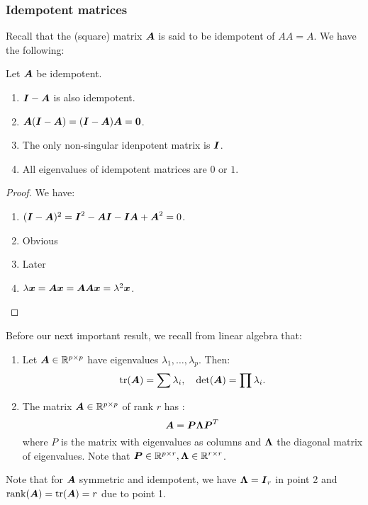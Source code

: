 \subsubsection{Idempotent matrices}
Recall that the (square) matrix $\boldsymbol{A}$ is said to be idempotent of $AA=A$. We have the following:
\begin{proposition}
    Let $\boldsymbol{A}$ be idempotent.
    \begin{enumerate}
        \item $\boldsymbol{I}-\boldsymbol{A}$ is also idempotent.
        \item $\boldsymbol{A}(\boldsymbol{I}-\boldsymbol{A})=(\boldsymbol{I}-\boldsymbol{A})\boldsymbol{A}=\boldsymbol{0}$.
        \item The only non-singular idenpotent matrix is $\boldsymbol{I}$.
        \item All eigenvalues of idempotent matrices are $0$ or $1$.
    \end{enumerate}
\end{proposition}
\begin{proof}
    We have:
    \begin{enumerate}
        \item $(\boldsymbol{I}-\boldsymbol{A})^2=\boldsymbol{I}^2-\boldsymbol{A}\boldsymbol{I}-\boldsymbol{I}\boldsymbol{A}+\boldsymbol{A}^2=0$.
        \item Obvious
        \item Later
        \item $\lambda\boldsymbol{x}=\boldsymbol{A}\boldsymbol{x}=\boldsymbol{A}\boldsymbol{A}\boldsymbol{x}=\lambda^2\boldsymbol{x}$.
    \end{enumerate}
\end{proof}
Before our next important result, we recall from linear algebra that:
\begin{enumerate}
    \item Let $\boldsymbol{A}\in\mathbb{R}^{p\times p}$ have eigenvalues $\lambda_1,\dots,\lambda_p$. Then:
        \begin{align*}
            \mathrm{tr}(\boldsymbol{A}) = \sum \lambda_i, \quad
            \mathrm{det}(\boldsymbol{A}) = \prod \lambda_i.
        \end{align*}
    \item The matrix $\boldsymbol{A}\in\mathbb{R}^{p\times p}$ of rank $r$ has :
        $$
            \boldsymbol{A} = \boldsymbol{P}\boldsymbol{\Lambda}\boldsymbol{P}^T
        $$
        where $P$ is the matrix with eigenvalues as columns and $\boldsymbol{\Lambda}$ the diagonal matrix of eigenvalues. Note that $\boldsymbol{P}\in\mathbb{R}^{p\times r}, \boldsymbol{\Lambda}\in\mathbb{R}^{r\times r}$.
\end{enumerate}
Note that for $\boldsymbol{A}$ symmetric and idempotent, we have $\boldsymbol{\Lambda}=\boldsymbol{I}_r$ in point 2 and $\mathrm{rank}(\boldsymbol{A})=\mathrm{tr}(\boldsymbol{A})=r$ due to point 1. 

